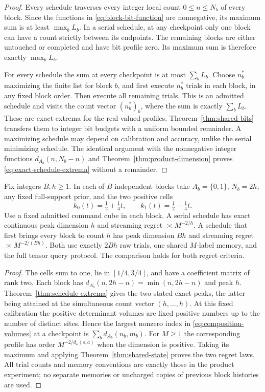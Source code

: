 \begin{proof}
Every schedule traverses every integer local count $0\le n\le N_b$
of every block. Since the functions in \eqref{eq:block-bit-function}
are nonnegative, its maximum sum is at least $\max_bL_b$. In a
serial schedule, at any checkpoint only one block can have a count
strictly between its endpoints. The remaining blocks are either untouched
or completed and have bit profile zero. Its maximum sum is therefore
exactly $\max_bL_b$.

For every schedule the sum at every checkpoint is at most $\sum_bL_b$.
Choose $n_b^*$ maximizing the finite list for block $b$, and first execute
$n_b^*$ trials in each block, in any fixed block order. Then execute all
remaining trials. This is an admitted schedule and visits the count
vector $(n_b^*)_b$, where the sum is exactly $\sum_bL_b$. These are
exact extrema for the real-valued profiles. Theorem~\ref{thm:shared-bits}
transfers them to integer bit budgets with a uniform bounded remainder.
A maximizing schedule may depend on calibration and accuracy, unlike the
serial minimizing schedule. The identical argument with the nonnegative
integer functions $d_{A_b}(n,N_b-n)$ and
Theorem~\ref{thm:product-dimension} proves
\eqref{eq:exact-schedule-extrema} without a remainder.
\end{proof}

\begin{corollary}\label{cor:concurrency-exponent}
Fix integers $B,h\ge1$. In each of $B$ independent blocks take
$A_b=\{0,1\}$, $N_b=2h$, any fixed full-support prior, and the two
positive cells
\[
 k_0(t)=\tfrac12+\tfrac14t,\qquad
 k_1(t)=\tfrac12-\tfrac14t.
\]
Use a fixed admitted command cube in each block. A serial schedule has
exact continuous peak dimension $h$ and streaming regret
$\asymp M^{-2/h}$. A schedule that first brings every block to count
$h$ has peak dimension $Bh$ and streaming regret
$\asymp M^{-2/(Bh)}$. Both use exactly $2Bh$ raw trials, one shared
$M$-label memory, and the full tensor query protocol. The comparison
holds for both regret criteria.
\end{corollary}
\begin{proof}
The cells sum to one, lie in $[1/4,3/4]$, and have a coefficient
matrix of rank two. Each block has
$d_{A_b}(n,2h-n)=\min(n,2h-n)$ and peak $h$.
Theorem~\ref{thm:schedule-extrema} gives the two stated exact peaks,
the latter being attained at the simultaneous count vector $(h,\ldots,h)$.
At this fixed calibration the positive determinant volumes are fixed
positive numbers up to the number of distinct sites. Hence the largest
nonzero index in \eqref{eq:composition-volumes} at a checkpoint is
$\sum_b d_{A_b}(n_b,m_b)$. For $M\ge1$ the corresponding profile
has order $M^{-2/d_\omega(s,a)}$ when the dimension is positive.
Taking its maximum and applying Theorem~\ref{thm:shared-state} proves
the two regret laws. All trial counts and memory conventions are exactly
those in the product experiment; no separate memories or uncharged
copies of previous block histories are used.
\end{proof}

